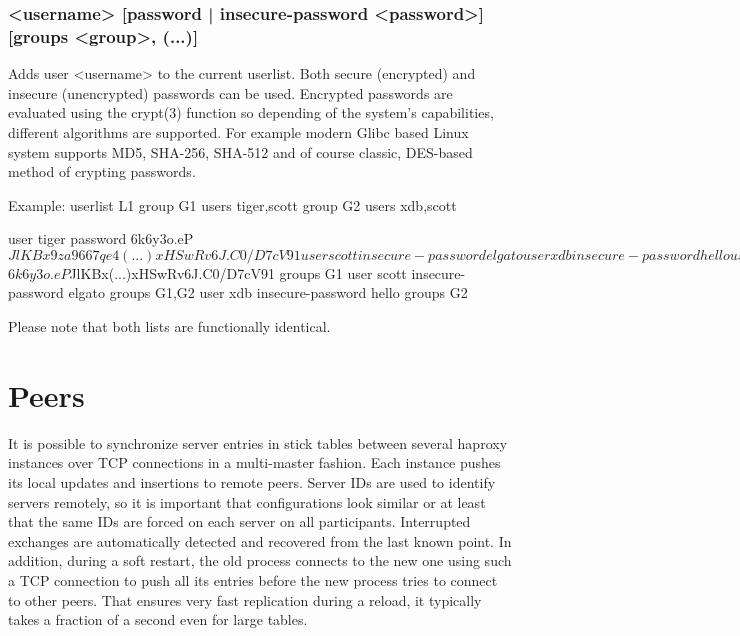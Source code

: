 \subsubsection[user]{ <username> [password | insecure-password <password>]
  [groups <group>, (...)]}

Adds user <username> to the current userlist. Both secure (encrypted) and
insecure (unencrypted) passwords can be used. Encrypted passwords are
evaluated using the crypt(3) function so depending of the system's
capabilities, different algorithms are supported. For example modern Glibc
based Linux system supports MD5, SHA-256, SHA-512 and of course classic,
DES-based method of crypting passwords.

\begin{example}{Example:}
        userlist L1
          group G1 users tiger,scott
          group G2 users xdb,scott

          user tiger password $6$k6y3o.eP$JlKBx9za9667qe4(...)xHSwRv6J.C0/D7cV91
          user scott insecure-password elgato
          user xdb insecure-password hello

        userlist L2
          group G1
          group G2

          user tiger password $6$k6y3o.eP$JlKBx(...)xHSwRv6J.C0/D7cV91 groups G1
          user scott insecure-password elgato groups G1,G2
          user xdb insecure-password hello groups G2
\end{example}

  Please note that both lists are functionally identical.

\section{Peers}
\label{sec:peers}

It is possible to synchronize server entries in stick tables between several
haproxy instances over TCP connections in a multi-master fashion. Each instance
pushes its local updates and insertions to remote peers. Server IDs are used to
identify servers remotely, so it is important that configurations look similar
or at least that the same IDs are forced on each server on all participants.
Interrupted exchanges are automatically detected and recovered from the last
known point. In addition, during a soft restart, the old process connects to
the new one using such a TCP connection to push all its entries before the new
process tries to connect to other peers. That ensures very fast replication
during a reload, it typically takes a fraction of a second even for large
tables.

